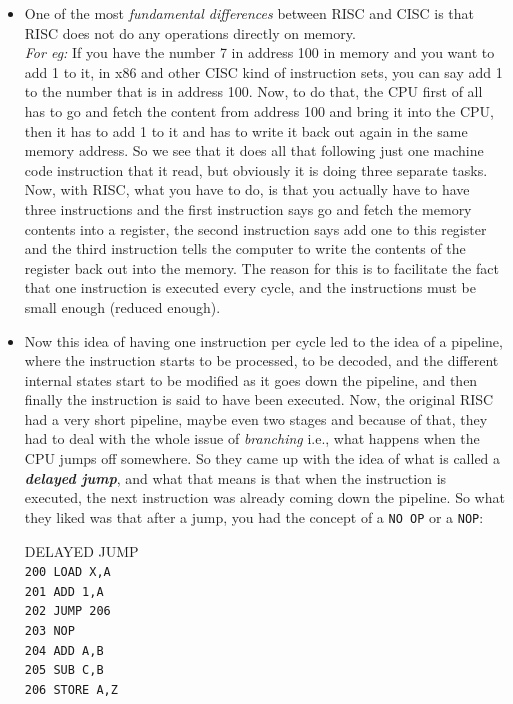 \documentclass[conference]{IEEEtran}
\begin{document}
\begin{itemize}
\item One of the most \textit{fundamental differences }between RISC and CISC is that RISC does not do any operations directly on memory. 
\\\textit{For eg: }If you have the number 7 in address 100 in memory and you want to add 1 to it, in x86 and other CISC kind of instruction sets, you can say add 1 to the number that is in address 100. 
Now, to do that, the CPU first of all has to go and fetch the content from address 100 and bring it into the CPU, then it has to add 1 to it and has to write it back out again in the same memory address. So we see that it does all that following just one machine code instruction that it read, but obviously it is doing three separate tasks.
\\Now, with RISC, what you have to do, is that you actually have to have three instructions and the first instruction says go and fetch the memory contents into a register, the second instruction says add one to this register and the third instruction tells the computer to write the contents of the register back out into the memory. The reason for this is to facilitate the fact that one instruction is executed every cycle, and the instructions must be small enough (reduced enough).

\item Now this idea of having one instruction per cycle led to the idea of a pipeline, where the instruction starts to be processed, to be decoded, and the different internal states start to be modified as it goes down the pipeline, and then finally the instruction is said to have been executed. Now, the original RISC had a very short pipeline, maybe even two stages and because of that, they had to deal with the whole issue of \textit{branching} i.e., what happens when the CPU jumps off somewhere. 
So they came up with the idea of what is called a \textbf{\textit{delayed jump}}, and what that means is that when the instruction is executed, the next instruction was already coming down the pipeline. So what they liked was that after a jump, you had the concept of a \verb|NO OP| or a \verb|NOP|:
\begin{center}
DELAYED JUMP
\\\verb|200 LOAD X,A|
\\\verb|201 ADD 1,A|
\\\verb|202 JUMP 206|
\\\verb|203 NOP|
\\\verb|204 ADD A,B|
\\\verb|205 SUB C,B|
\\\verb|206 STORE A,Z|
\end{center}


\end{itemize}
\end{document}
